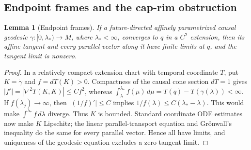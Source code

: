 \documentclass[10pt]{article}
\newtheorem{lemma}[theorem]{Lemma}
\begin{document}
\subsection{Endpoint frames and the cap-rim obstruction}
\label{app:compact-cap}

\begin{lemma}[Endpoint frames]
\label{lem:endpoint-frames}
If a future-directed affinely parametrized causal geodesic
\(\gamma:[0,\lambda_*)\to M\), where \(\lambda_*<\infty\), converges to \(q\)
in a \(C^2\) extension, then its affine tangent and every parallel vector along
it have finite limits at \(q\), and the tangent limit is nonzero.
\end{lemma}

\begin{proof}
In a relatively compact extension chart with temporal coordinate \(T\), put
\(K=\dot\gamma\) and \(f=dT(K)>0\).  Compactness of the causal cone section
\(dT=1\) gives \(|f'|=|\nabla^2T(K,K)|\leq Cf^2\), whereas
\(\int_\lambda^{\lambda_*}f(\mu)\,d\mu
  =T(q)-T(\gamma(\lambda))<\infty\).
If \(f(\lambda_j)\to\infty\), then \(|(1/f)'|\leq C\) implies
\(1/f(\lambda)\leq C(\lambda_* -\lambda)\).  This would make
\(\int^{\lambda_*}f\,d\lambda\) diverge.  Thus \(K\) is bounded.  Standard
coordinate ODE estimates now make \(K\) Lipschitz; the linear
parallel-transport equation and Gr\"onwall's inequality do the same for every
parallel vector.  Hence all have limits, and uniqueness of the geodesic equation
excludes a zero tangent limit.
\end{proof}
\end{document}
